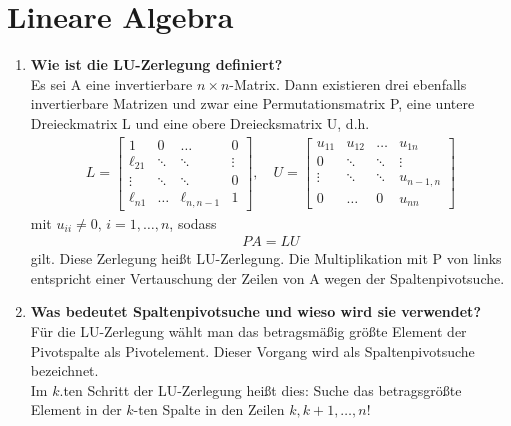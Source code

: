 \section{Lineare Algebra}
	\begin{enumerate}
		\item \textbf{Wie ist die LU-Zerlegung definiert?} \\
			Es sei A eine invertierbare \(n\times n\)-Matrix. Dann existieren drei ebenfalls invertierbare Matrizen und zwar eine Permutationsmatrix P, eine untere Dreieckmatrix L und eine obere Dreiecksmatrix U, d.h.
			\begin{align*}
				L = \begin{bmatrix}
					1 & 0 & \dots & 0 \\
					\ell_{21} & \ddots & \ddots & \vdots \\
					\vdots & \ddots & \ddots & 0 \\
					\ell_{n1} & \dots & \ell_{n,n-1} & 1
				\end{bmatrix}, \quad
				U = \begin{bmatrix}
					u_{11} & u_{12} & \dots & u_{1n}\\
					0 & \ddots & \ddots & \vdots \\
					\vdots & \ddots & \ddots & u_{n-1,n} \\
					0 & \dots & 0 & u_{nn}
				\end{bmatrix}
			\end{align*}
			mit \(u_{ii}\neq0,\,i=1,\dots,n\), sodass
			\begin{align*}
				PA=LU
			\end{align*}
			gilt. Diese Zerlegung heißt LU-Zerlegung. Die Multiplikation mit P von links entspricht einer Vertauschung der Zeilen von A wegen der Spaltenpivotsuche.
		
		\item \textbf{Was bedeutet Spaltenpivotsuche und wieso wird sie verwendet?} \\
			Für die LU-Zerlegung wählt man das betragsmäßig größte Element der Pivotspalte als Pivotelement. Dieser Vorgang wird als Spaltenpivotsuche bezeichnet. \\
			Im \(k\).ten Schritt der LU-Zerlegung heißt dies: Suche das betragsgrößte Element in der \(k\)-ten Spalte in den Zeilen \(k,k+1,\dots,n\)!
		

\end{enumerate}
